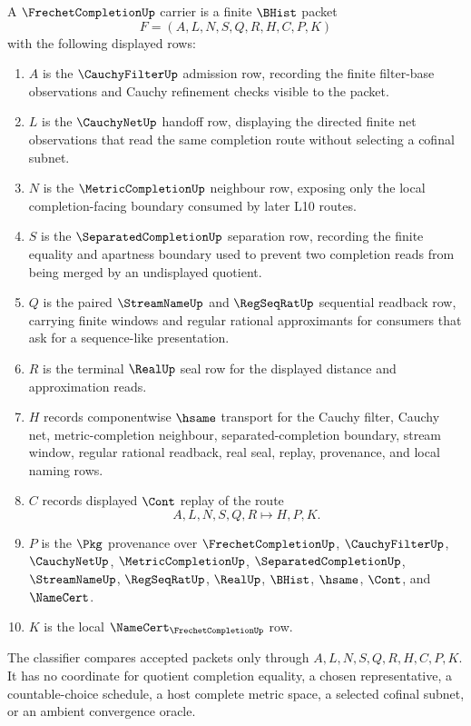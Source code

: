 \begin{definition}\label{def:frechet-completion-carrier}
A $\FrechetCompletionUp$ carrier is a finite $\BHist$ packet
$$
F=(A,L,N,S,Q,R,H,C,P,K)
$$
with the following displayed rows:
\begin{enumerate}
\item $A$ is the $\CauchyFilterUp$ admission row, recording the finite filter-base observations and Cauchy refinement checks visible to the packet.
\item $L$ is the $\CauchyNetUp$ handoff row, displaying the directed finite net observations that read the same completion route without selecting a cofinal subnet.
\item $N$ is the $\MetricCompletionUp$ neighbour row, exposing only the local completion-facing boundary consumed by later L10 routes.
\item $S$ is the $\SeparatedCompletionUp$ separation row, recording the finite equality and apartness boundary used to prevent two completion reads from being merged by an undisplayed quotient.
\item $Q$ is the paired $\StreamNameUp$ and $\RegSeqRatUp$ sequential readback row, carrying finite windows and regular rational approximants for consumers that ask for a sequence-like presentation.
\item $R$ is the terminal $\RealUp$ seal row for the displayed distance and approximation reads.
\item $H$ records componentwise $\hsame$ transport for the Cauchy filter, Cauchy net, metric-completion neighbour, separated-completion boundary, stream window, regular rational readback, real seal, replay, provenance, and local naming rows.
\item $C$ records displayed $\Cont$ replay of the route
$$
A,L,N,S,Q,R \longmapsto H,P,K .
$$
\item $P$ is the $\Pkg$ provenance over $\FrechetCompletionUp$, $\CauchyFilterUp$, $\CauchyNetUp$, $\MetricCompletionUp$, $\SeparatedCompletionUp$, $\StreamNameUp$, $\RegSeqRatUp$, $\RealUp$, $\BHist$, $\hsame$, $\Cont$, and $\NameCert$.
\item $K$ is the local $\NameCert_{\FrechetCompletionUp}$ row.
\end{enumerate}
The classifier compares accepted packets only through $A,L,N,S,Q,R,H,C,P,K$. It has no coordinate for quotient completion equality, a chosen representative, a countable-choice schedule, a host complete metric space, a selected cofinal subnet, or an ambient convergence oracle.
\end{definition}

